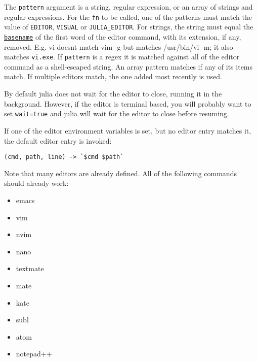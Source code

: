\begin{adjustwidth}{2em}{0pt}
The \texttt{pattern} argument is a string, regular expression, or an array of strings and regular expressions. For the \texttt{fn} to be called, one of the patterns must match the value of \texttt{EDITOR}, \texttt{VISUAL} or \texttt{JULIA\_EDITOR}. For strings, the string must equal the \hyperlink{16452154606861459390}{\texttt{basename}} of the first word of the editor command, with its extension, if any, removed. E.g. {\textquotedbl}vi{\textquotedbl} doesn{\textquotesingle}t match {\textquotedbl}vim -g{\textquotedbl} but matches {\textquotedbl}/usr/bin/vi -m{\textquotedbl}; it also matches \texttt{vi.exe}. If \texttt{pattern} is a regex it is matched against all of the editor command as a shell-escaped string. An array pattern matches if any of its items match. If multiple editors match, the one added most recently is used.

By default julia does not wait for the editor to close, running it in the background. However, if the editor is terminal based, you will probably want to set \texttt{wait=true} and julia will wait for the editor to close before resuming.

If one of the editor environment variables is set, but no editor entry matches it, the default editor entry is invoked:


\begin{lstlisting}
(cmd, path, line) -> `$cmd $path`
\end{lstlisting}

Note that many editors are already defined. All of the following commands should already work:

\begin{itemize}
\item emacs


\item vim


\item nvim


\item nano


\item textmate


\item mate


\item kate


\item subl


\item atom


\item notepad++



\end{itemize}
\end{adjustwidth}
